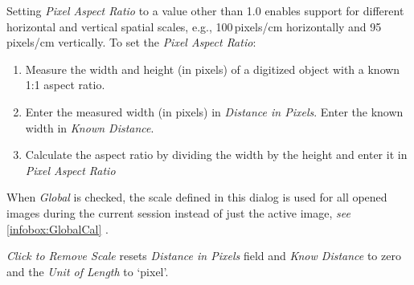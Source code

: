 \medskip{}
Setting \emph{Pixel Aspect Ratio} to a value other than 1.0 enables
support for different horizontal and vertical spatial scales, e.g.,
100\,pixels/cm horizontally and 95\,pixels/cm vertically. To set
the \emph{Pixel Aspect Ratio}:
\begin{enumerate}
\item Measure the width and height (in pixels) of a digitized object with
a known 1:1 aspect ratio.
\item Enter the measured width (in pixels) in \emph{Distance in Pixels}.
Enter the known width in \emph{Known Distance}.
\item Calculate the aspect ratio by dividing the width by the height and
enter it in \emph{Pixel Aspect Ratio}
\end{enumerate}
When \emph{Global} is checked, the scale defined in this dialog is
used for all opened images during the current session instead of just
the active image, \emph{see} \ref{infobox:GlobalCal} .

\emph{Click to Remove Scale} resets \emph{Distance in Pixels} field
and \emph{Know Distance} to zero and the \emph{Unit of Length} to
`pixel'.




\subsection[\protect\userinterface{Calibrate\ldots{}}]{\protect{}\label{sub:Calibrate...}\improvement{}}

